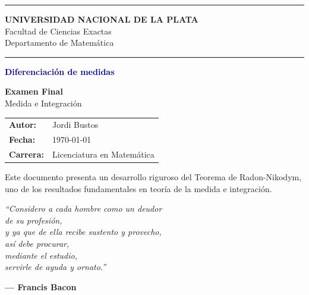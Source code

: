\documentclass[12pt,a4paper]{article}
\theoremstyle{profesional}
\theoremstyle{definicion-style}
\begin{document}
\thispagestyle{empty}
\begin{center}
    \vspace*{1cm}

    \textcolor{darkblue}{\rule{\linewidth}{2pt}}

    \vspace{0.5cm}
    {\large \textbf{UNIVERSIDAD NACIONAL DE LA PLATA}}\\
    {\normalsize Facultad de Ciencias Exactas}\\
    {\normalsize Departamento de Matemática}\\

    \vspace{0.5cm}
    \textcolor{darkblue}{\rule{\linewidth}{2pt}}

    \vspace{2.5cm}

    {\Huge \textbf{\textcolor{darkblue}{Diferenciación de medidas}}}\\

    \vspace{3cm}

    {\large \textbf{Examen Final}}\\
    {\normalsize Medida e Integración}

    \vspace{2.5cm}

    {\normalsize
        \begin{tabular}{ll}
            \textbf{Autor:}   & Jordi Bustos               \\
            \textbf{Fecha:}   & \today                     \\
            \textbf{Carrera:} & Licenciatura en Matemática
        \end{tabular}
    }

    \vfill

    {\footnotesize \textcolor{mediumgray}{%
            Este documento presenta un desarrollo riguroso del Teorema de Radon-Nikodym,\\
            uno de los resultados fundamentales en teoría de la medida e integración.
        }}

    \vspace{1cm}
\end{center}

\newpage

\thispagestyle{empty}
\vspace*{\fill}

\begin{flushright}
    \textit{``Considero a cada hombre como un deudor}\\
    \textit{de su profesión,}\\
    \textit{y ya que de ella recibe sustento y provecho,}\\
    \textit{así debe procurar,}\\
    \textit{mediante el estudio,}\\
    \textit{servirle de ayuda y ornato.''}

    \vspace{0.5cm}
    \textbf{--- Francis Bacon}
\end{flushright}
\end{document}
